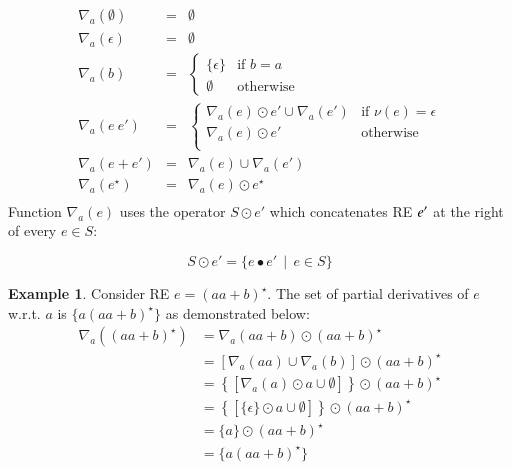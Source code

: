 \documentclass[review]{elsarticle}
\theoremstyle{definition}
\newtheorem{Example}{Example}
\newcommand{\V}[1]{\purple{\mathit{#1}}}
\begin{document}
\[
\begin{array}{lclr}
  \nabla_a(\emptyset) & = & \emptyset\\
  \nabla_a(\epsilon) & = & \emptyset \\
  \nabla_a(b) & = & \left\{
                      \begin{array}{lr}
                        \{\epsilon\} & \text{if } b = a\\
                        \emptyset & \text{otherwise}
                      \end{array}
                                \right.\\
  \nabla_a(e\:e') & = & \left \{
                           \begin{array}{lr}
                              \nabla_a(e) \odot e' \cup \nabla_a(e') & \text{if }\nu(e) = \epsilon \\
                              \nabla_a(e) \odot e' & \text{otherwise} \\
                           \end{array} \right . \\
  \nabla_a(e + e') & = & \nabla_a(e) \cup \nabla_a(e') \\
  \nabla_a(e^\star) & = & \nabla_a(e) \odot e^\star\\
\end{array}
\]
Function $\nabla_a(e)$ uses the operator $S \odot e'$ which concatenates RE \ensuremath{\V{e'}} at the right of every $e \in S$:

\[
  S \odot e' = \{e ∙ e'\,\mid\, e \in S\}
\]

\begin{Example}
    Consider RE $e = (aa + b)^\star$. The set of partial derivatives of $e$ w.r.t. $a$ is 
    $\{a(aa + b)^\star\}$ as demonstrated below:
    \begin{align*}
        \nabla_a((aa + b)^\star) &= \nabla_a(aa + b) \odot (aa + b)^\star \\
                                 &= \left\lbrack \nabla_a(aa) \cup \nabla_a(b)\right\rbrack \odot (aa + b)^\star \\
                                 &= \left\{\left\lbrack \nabla_a(a) \odot a \cup \emptyset\right\rbrack \right\}\odot (aa + b)^\star \\
                                 &= \left\{\left\lbrack \{\epsilon\} \odot a \cup \emptyset\right\rbrack \right\}\odot (aa + b)^\star \\
                                 &= \{a\} \odot (aa + b)^\star \\
                                 &= \{a(aa + b)^\star\}
    \end{align*}
\end{Example}    
\end{document}
